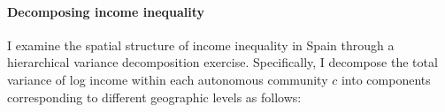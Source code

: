 

\paragraph{Decomposing income inequality} I examine the spatial structure of income inequality in Spain through a hierarchical variance decomposition exercise. Specifically, I decompose the total variance of log income within each autonomous community $c$  into components corresponding to different geographic levels as follows:

